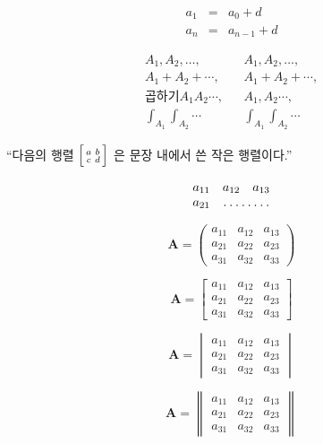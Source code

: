 \documentclass[11pt]{article}
\begin{document}
\begin{subequations}
\begin{eqnarray}
a_1 & = & a_0 + d \\
a_n & = & a_{n-1} + d
\end{eqnarray}
\end{subequations}

\begin{subequations}
\begin{eqnarray}
A_1, A_2, \dotsc, & & A_1, A_2, \ldots, \\
A_1 + A_2 +\dotsb, & & A_1 + A_2 +\cdots, \\
\text{곱하기} A_1 A_2 \dotsm, & & A_1, A_2 \cdots, \\
\int_{A_1}\int_{A_2}\dotsi & & \int_{A_1}\int_{A_2} \cdots
\end{eqnarray}
\end{subequations}

``다음의 행렬 $\Bigl[\begin{smallmatrix} a & b \\ c & d \end{smallmatrix}\Bigr]$ 은 문장 내에서 쓴 작은 행렬이다.''

$$\begin{matrix}
a_{11} & a_{12} & a_{13} \\
a_{21} & \hdotsfor{2}
\end{matrix}$$

$$\pmb{A} = \begin{pmatrix}
a_{11} & a_{12} & a_{13} \\
a_{21} & a_{22} & a_{23} \\
a_{31} & a_{32} & a_{33}
\end{pmatrix}$$

$$\pmb{A} = \begin{bmatrix}
a_{11} & a_{12} & a_{13} \\
a_{21} & a_{22} & a_{23} \\
a_{31} & a_{32} & a_{33}
\end{bmatrix}$$

$$\pmb{A} = \begin{vmatrix}
a_{11} & a_{12} & a_{13} \\
a_{21} & a_{22} & a_{23} \\
a_{31} & a_{32} & a_{33}
\end{vmatrix}$$

$$\pmb{A} = \begin{Vmatrix}
a_{11} & a_{12} & a_{13} \\
a_{21} & a_{22} & a_{23} \\
a_{31} & a_{32} & a_{33}
\end{Vmatrix}$$
\end{document}
